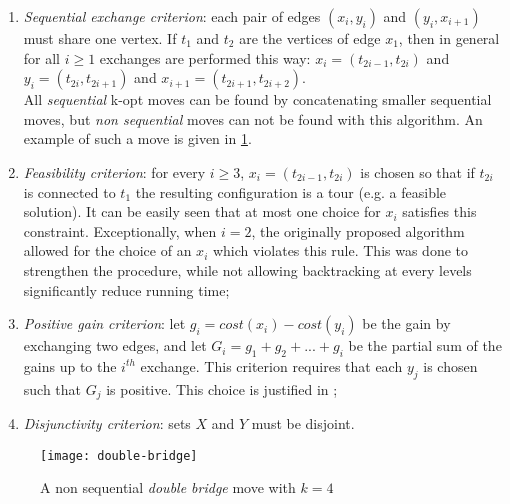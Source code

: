 \begin{enumerate}
	\item \emph{Sequential exchange criterion}: each pair of edges $(x_i, y_i)$ and $(y_i, x_{i+1})$ must share one vertex. If $t_1$ and $t_2$ are the vertices of edge $x_1$, then in general for all $i \ge 1$ exchanges are performed this way: $x_i=(t_{2i-1}, t_{2i})$ and $y_i=(t_{2i}, t_{2i+1})$ and $x_{i+1}=(t_{2i+1}, t_{2i+2})$.\\ All \emph{sequential} k-opt moves can be found by concatenating smaller sequential moves, but \emph{non sequential} moves can not be found with this algorithm. An example of such a move is given in \cref{fig:doublebridge}.
	\item \emph{Feasibility criterion}: for every $i \ge 3$, $x_i=(t_{2i-1}, t_{2i})$ is chosen so that if $t_{2i}$ is connected to $t_1$ the resulting configuration is a tour (e.g. a feasible solution). It can be easily seen that at most one choice for $x_i$ satisfies this constraint. Exceptionally, when $i=2$, the originally proposed algorithm allowed for the choice of an $x_i$ which violates this rule. This was done to strengthen the procedure, while not allowing backtracking at every levels significantly reduce running time;
	\item \emph{Positive gain criterion}: let $g_i=cost(x_i) - cost(y_i)$ be the gain by exchanging two edges, and let $G_i=g_1+g_2+...+g_i$ be the partial sum of the gains up to the $i^{th}$ exchange. This criterion requires that each $y_j$ is chosen such that $G_j$ is positive. This choice is justified in \cite{Helsgaun2000};
	\item \emph{Disjunctivity criterion}: sets $X$ and $Y$ must be disjoint.
\end{enumerate}

\begin{figure}[]
	\centering
	\texttt{[image: double-bridge]}
	\caption{A non sequential \emph{double bridge} move with $k=4$}
	\label{fig:doublebridge}
\end{figure}

